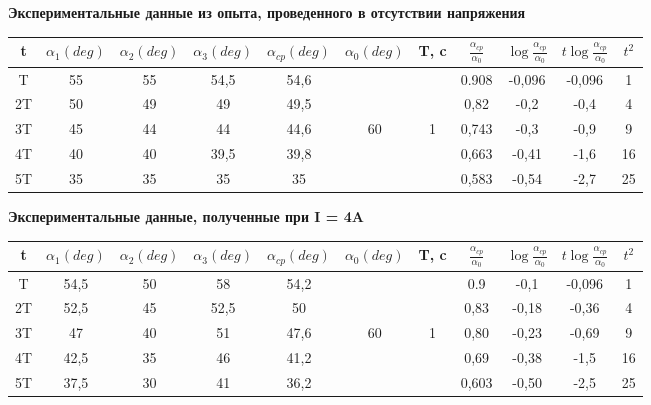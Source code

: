 \documentclass{article}
\begin{document}
	
	\begin{center}
		\textbf{Экспериментальные данные из опыта, проведенного в отсутствии напряжения}
		\begin{tabular}{|c|c|c|c|c|c|c|c|c|c|c|}
			\hline
			t & $\alpha_1 (deg)$ & $\alpha_2 (deg)$ & $\alpha_3 (deg)$ & $\alpha_{cp} (deg)$ & $\alpha_0 (deg)$ & T, c & $\frac{\alpha_{cp}}{\alpha_0}$ & $\log{\frac{\alpha_{cp}}{\alpha_0}}$ & $t\log{\frac{\alpha_{cp}}{\alpha_0}}$ & $t^{2}$ \\
			\hline
			T & 55 & 55 & 54,5 & 54,6 & & & 0.908 & -0,096 & -0,096 & 1 \\
			\hhline{-----~~----}
			2T & 50 & 49 & 49 & 49,5 & & & 0,82 & -0,2 & -0,4 & 4 \\
			\hhline{-----~~----}
			3T & 45 & 44 & 44 & 44,6 & 60 & 1 & 0,743 & -0,3 & -0,9 & 9 \\
			\hhline{-----~~----}
			4T & 40 & 40 & 39,5 & 39,8 & & & 0,663 & -0,41 & -1,6 & 16 \\
			\hhline{-----~~----}
			5T & 35 & 35 & 35 & 35 & & & 0,583 & -0,54 & -2,7 & 25 \\
			\hline
		\end{tabular}
	\end{center}
	
	\begin{center}
		\textbf{Экспериментальные данные, полученные при I = 4A}
		\begin{tabular}{|c|c|c|c|c|c|c|c|c|c|c|}
			\hline
			t & $\alpha_1 (deg)$ & $\alpha_2 (deg)$ & $\alpha_3 (deg)$ & $\alpha_{cp} (deg)$ & $\alpha_0 (deg)$ & T, c & $\frac{\alpha_{cp}}{\alpha_0}$ & $\log{\frac{\alpha_{cp}}{\alpha_0}}$ & $t\log{\frac{\alpha_{cp}}{\alpha_0}}$ & $t^{2}$ \\
			\hline
			T & 54,5 & 50 & 58 & 54,2 & & & 0.9 & -0,1 & -0,096 & 1 \\
			
			\hhline{-----~~----}
			2T & 52,5 & 45 &52,5 & 50 & & & 0,83 & -0,18 & -0,36 & 4 \\
			\hhline{-----~~----}
			3T & 47 & 40 & 51 & 47,6 & 60 & 1 & 0,80 & -0,23 & -0,69 & 9 \\
			\hhline{-----~~----}
			4T & 42,5 & 35 & 46 & 41,2 & & & 0,69 & -0,38 & -1,5 & 16 \\
			\hhline{-----~~----}
			5T & 37,5 & 30 & 41 & 36,2 & & & 0,603 & -0,50 & -2,5 & 25 \\
			\hline
		\end{tabular}
		
	\end{center}
	
\end{document}
